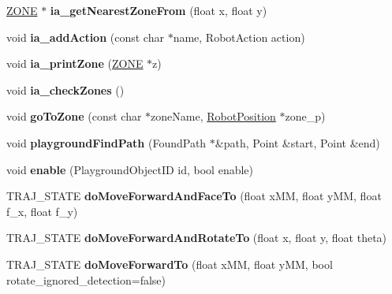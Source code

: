 \begin{DoxyCompactItemize}
\hyperlink{structZONE}{Z\+O\+NE} $\ast$ {\bfseries ia\+\_\+get\+Nearest\+Zone\+From} (float x, float y)
\item 
\mbox{\label{classIAbyPath_a8b7ee1e28ac3b80eb56aa484755f4676}} 
void {\bfseries ia\+\_\+add\+Action} (const char $\ast$name, Robot\+Action action)
\item 
\mbox{\label{classIAbyPath_ac0ec21dccd4242021490415071acd8e1}} 
void {\bfseries ia\+\_\+print\+Zone} (\hyperlink{structZONE}{Z\+O\+NE} $\ast$z)
\item 
\mbox{\label{classIAbyPath_a659be955d17b16795bd842079c9a154d}} 
void {\bfseries ia\+\_\+check\+Zones} ()
\item 
\mbox{\label{classIAbyPath_a27cb9230173b269f6492e8265d4b4a9c}} 
void {\bfseries go\+To\+Zone} (const char $\ast$zone\+Name, \hyperlink{structRobotPosition}{Robot\+Position} $\ast$zone\+\_\+p)
\item 
\mbox{\label{classIAbyPath_a44107ea221a5d20ae780247bc814203c}} 
void {\bfseries playground\+Find\+Path} (Found\+Path $\ast$\&path, Point \&start, Point \&end)
\item 
\mbox{\label{classIAbyPath_aac20ab04b45d22e8ceae82504416716e}} 
void {\bfseries enable} (Playground\+Object\+ID id, bool enable)
\item 
\mbox{\label{classIAbyPath_a4bf13457ddf9d6a51294ad620cb0b9bf}} 
T\+R\+A\+J\+\_\+\+S\+T\+A\+TE {\bfseries do\+Move\+Forward\+And\+Face\+To} (float x\+MM, float y\+MM, float f\+\_\+x, float f\+\_\+y)
\item 
\mbox{\label{classIAbyPath_a93df0ec9c67fa09403092b6d5926b582}} 
T\+R\+A\+J\+\_\+\+S\+T\+A\+TE {\bfseries do\+Move\+Forward\+And\+Rotate\+To} (float x, float y, float theta)
\item 
\mbox{\label{classIAbyPath_a1b41ff8776b67b268c9cfc2be5c70ac4}} 
T\+R\+A\+J\+\_\+\+S\+T\+A\+TE {\bfseries do\+Move\+Forward\+To} (float x\+MM, float y\+MM, bool rotate\+\_\+ignored\+\_\+detection=false)
\item 
\mbox{\label{classIAbyPath_a835177193bbd053e7901405bbd486401}} 

\end{DoxyCompactItemize}
